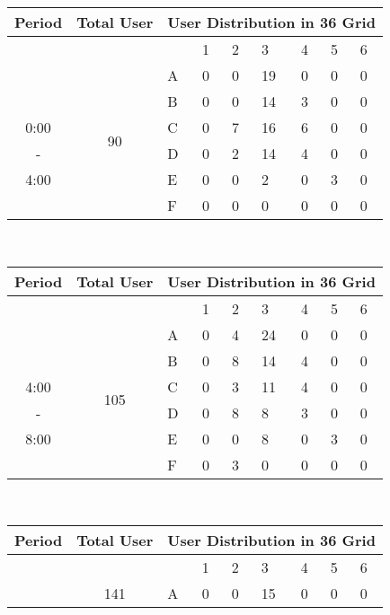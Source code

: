 \begin{table*}[hpt]	
\begin{minipage}{.5\linewidth}	
\centering	
\begin{tabular}{|c|c|p{0.4cm}|p{0.4cm}|p{0.4cm}|p{0.4cm}|p{0.4cm}|p{0.4cm}|p{0.4cm}|}	
\hline	
Period & Total User &\multicolumn{7}{c|}{User Distribution in 36 Grid} \\	
\hline	
&& & 1 &2 & 3 & 4 & 5&6\\	
\cline{3-9}	
 & \multirow{7}{*}{90}	
 &A	
& 0& 0& 19& 0& 0& 0  \\	
\cline{3-9}	
 && B	
& 0& 0& 14& 3& 0& 0  \\	
\cline{3-9}	
0:00 && C	
& 0& 7& 16& 6& 0& 0  \\	
\cline{3-9}	
 -&& D 	
& 0& 2& 14& 4& 0& 0  \\	
\cline{3-9}	
4:00 && E 	
& 0& 0& 2& 0& 3& 0  \\	
\cline{3-9}	
 && F 	
& 0& 0& 0& 0& 0& 0  \\	
\hline	
\end{tabular}	
\vspace*{0.1in} \\	
\begin{tabular}{|c|c|p{0.4cm}|p{0.4cm}|p{0.4cm}|p{0.4cm}|p{0.4cm}|p{0.4cm}|p{0.4cm}|}	
\hline	
Period & Total User &\multicolumn{7}{c|}{User Distribution in 36 Grid} \\	
\hline	
&& & 1 &2 & 3 & 4 & 5&6\\	
\cline{3-9}	
 & \multirow{7}{*}{105}	
 &A	
& 0& 4& 24& 0& 0& 0  \\	
\cline{3-9}	
 && B	
& 0& 8& 14& 4& 0& 0  \\	
\cline{3-9}	
4:00 && C	
& 0& 3& 11& 4& 0& 0  \\	
\cline{3-9}	
 -&& D 	
& 0& 8& 8& 3& 0& 0  \\	
\cline{3-9}	
8:00 && E 	
& 0& 0& 8& 0& 3& 0  \\	
\cline{3-9}	
 && F 	
& 0& 3& 0& 0& 0& 0  \\	
\hline	
\end{tabular}	
\vspace*{0.1in} \\	
\begin{tabular}{|c|c|p{0.4cm}|p{0.4cm}|p{0.4cm}|p{0.4cm}|p{0.4cm}|p{0.4cm}|p{0.4cm}|}	
\hline	
Period & Total User &\multicolumn{7}{c|}{User Distribution in 36 Grid} \\	
\hline	
&& & 1 &2 & 3 & 4 & 5&6\\	
\cline{3-9}	
 & \multirow{7}{*}{141}	
 &A	
& 0& 0& 15& 0& 0& 0  \\	

\end{tabular}
\end{minipage}
\end{table*}
